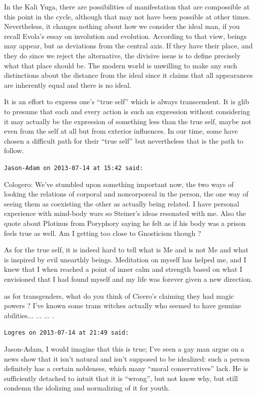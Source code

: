 \begin{footnotesize}
\begin{sffamily}
In the Kali Yuga, there are possibilities of manifestation that are compossible at this point in the cycle, although that may not have been possible at other times. Nevertheless, it changes nothing about how we consider the ideal man, if you recall Evola's essay on involution and evolution. According to that view, beings may appear, but as deviations from the central axis. If they have their place, and they do since we reject the alternative, the divisive issue is to define precisely what that place should be. The modern world is unwilling to make any such distinctions about the distance from the ideal since it claims that all appearances are inherently equal and there is no ideal.

It is an effort to express one's ``true self'' which is always transcendent. It is glib to presume that each and every action is such an expression without considering it may actually be the expression of something less than the true self, maybe not even from the self at all but from exterior influences. In our time, some have chosen a difficult path for their ``true self'' but nevertheless that is the path to follow.

\hfill

\texttt{Jason-Adam on 2013-07-14 at 15:42 said:}

Cologero: We've stumbled upon something important now, the two ways of looking the relations of corporal and noncorporeal in the person, the one way of seeing them as coexisting the other as actually being related. I have personal experience with mind-body wars so Steiner's ideas resonated with me. Also the quote about Plotinus from Poryphory saying he felt as if his body was a prison feels true as well. Am I getting too close to Gnosticism though ?

As for the true self, it is indeed hard to tell what is Me and is not Me and what is inspired by evil unearthly beings. Meditation on myself has helped me, and I knew that I when reached a point of inner calm and strength based on what I envisioned that I had found myself and my life was forever given a new direction.

as for transgenders, what do you think of Cicero's claiming they had magic powers ? I've known some trans witches actually who seemed to have genuine abilities... ... ... .

\hfill

\texttt{Logres on 2013-07-14 at 21:49 said:}

Jason-Adam, I would imagine that this is true; I've seen a gay man argue on a news show that it isn't natural and isn't supposed to be idealized: such a person definitely has a certain nobleness, which many ``moral conservatives'' lack. He is sufficiently detached to intuit that it is ``wrong'', but not know why, but still condemn the idolizing and normalizing of it for youth.


\end{sffamily}
\end{footnotesize}
